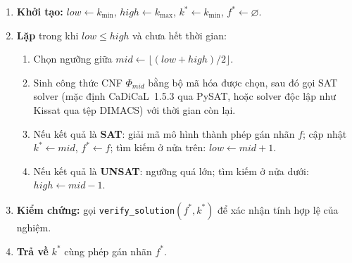 \documentclass[a4paper,fleqn]{cas-sc}
\begin{document}
\begin{enumerate}
  \item \textbf{Khởi tạo:} $low \leftarrow k_{\min}$, $high \leftarrow k_{\max}$, $k^\ast \leftarrow k_{\min}$, $f^\ast \leftarrow \varnothing$.
  \item \textbf{Lặp} trong khi $low \le high$ và chưa hết thời gian:
  \begin{enumerate}
    \item Chọn ngưỡng giữa $mid \leftarrow \lfloor (low + high) / 2 \rfloor$.
    \item Sinh công thức CNF $\Phi_{mid}$ bằng bộ mã hóa được chọn, sau đó gọi SAT solver (mặc định CaDiCaL~1.5.3 qua PySAT, hoặc solver độc lập như Kissat qua tệp DIMACS) với thời gian còn lại.
    \item Nếu kết quả là \textbf{SAT}: giải mã mô hình thành phép gán nhãn $f$; cập nhật $k^\ast \leftarrow mid$, $f^\ast \leftarrow f$; tìm kiếm ở nửa trên: $low \leftarrow mid + 1$.
    \item Nếu kết quả là \textbf{UNSAT}: ngưỡng quá lớn; tìm kiếm ở nửa dưới: $high \leftarrow mid - 1$.
  \end{enumerate}
  \item \textbf{Kiểm chứng:} gọi \texttt{verify\_solution}$(f^\ast, k^\ast)$ để xác nhận tính hợp lệ của nghiệm.
  \item \textbf{Trả về} $k^\ast$ cùng phép gán nhãn $f^\ast$.
\end{enumerate}
\end{document}
